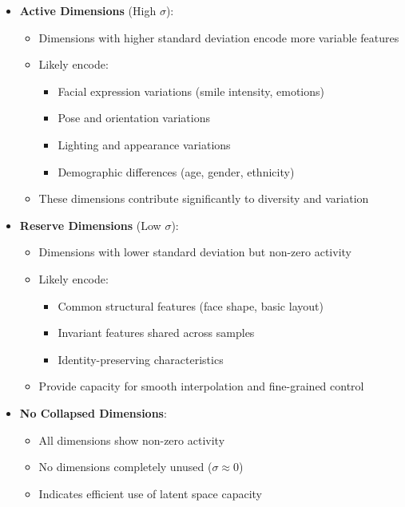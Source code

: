 \documentclass[conference]{IEEEtran}
\begin{document}
\begin{itemize}
    \item \textbf{Active Dimensions} (High $\sigma$):
    \begin{itemize}
        \item Dimensions with higher standard deviation encode more variable features
        \item Likely encode:
        \begin{itemize}
            \item Facial expression variations (smile intensity, emotions)
            \item Pose and orientation variations
            \item Lighting and appearance variations
            \item Demographic differences (age, gender, ethnicity)
        \end{itemize}
        \item These dimensions contribute significantly to diversity and variation
    \end{itemize}
    
    \item \textbf{Reserve Dimensions} (Low $\sigma$):
    \begin{itemize}
        \item Dimensions with lower standard deviation but non-zero activity
        \item Likely encode:
        \begin{itemize}
            \item Common structural features (face shape, basic layout)
            \item Invariant features shared across samples
            \item Identity-preserving characteristics
        \end{itemize}
        \item Provide capacity for smooth interpolation and fine-grained control
    \end{itemize}
    
    \item \textbf{No Collapsed Dimensions}:
    \begin{itemize}
        \item All dimensions show non-zero activity
        \item No dimensions completely unused ($\sigma \approx 0$)
        \item Indicates efficient use of latent space capacity
    \end{itemize}
\end{itemize}
\end{document}
